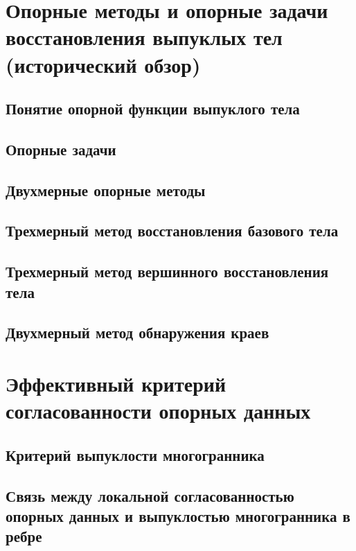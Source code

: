 \documentclass[a4paper, 12pt, titlepage]{article}
\theoremstyle{definition}
\theoremstyle{plain}
\theoremstyle{plain}
\begin{document}

\section{Опорные методы и опорные задачи восстановления выпуклых
тел (исторический обзор)}

\subsection{Понятие опорной функции выпуклого тела}

\subsection{Опорные задачи}

\subsection{Двухмерные опорные методы}

\subsection{Трехмерный метод восстановления базового тела}

\subsection{Трехмерный метод вершинного восстановления тела}

\subsection{Двухмерный метод обнаружения краев}


\section{Эффективный критерий согласованности опорных данных}

\subsection{Критерий выпуклости многогранника}

\subsection{Связь между локальной согласованностью опорных данных и выпуклостью
многогранника в ребре}
\end{document}
